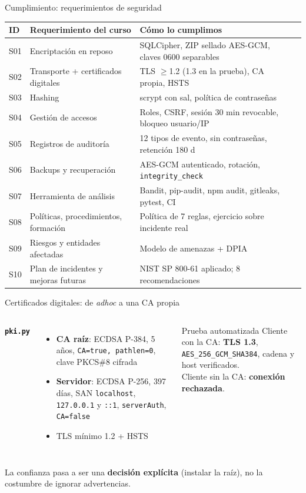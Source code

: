 \documentclass[aspectratio=169,11pt]{beamer}
\newcommand{\ok}{\textcolor{teal}{\textbf{\checkmark}}}
\begin{document}
\begin{frame}{Cumplimiento: requerimientos de seguridad}
\scriptsize
\begin{tabularx}{\textwidth}{@{}l Y Y c@{}}
\toprule
ID & Requerimiento del curso & Cómo lo cumplimos & \\
\midrule
S01 & Encriptación en reposo & SQLCipher, ZIP sellado AES-GCM, claves 0600 separables & \ok\\
S02 & Transporte + certificados digitales & TLS $\geq$1.2 (1.3 en la prueba), CA propia, HSTS & \ok\\
S03 & Hashing & scrypt con sal, política de contraseñas & \ok\\
S04 & Gestión de accesos & Roles, CSRF, sesión 30 min revocable, bloqueo usuario/IP & \ok\\
S05 & Registros de auditoría & 12 tipos de evento, sin contraseñas, retención 180 d & \ok\\
S06 & Backups y recuperación & AES-GCM autenticado, rotación, \texttt{integrity\_check} & \ok\\
S07 & Herramienta de análisis & Bandit, pip-audit, npm audit, gitleaks, pytest, CI & \ok\\
S08 & Políticas, procedimientos, formación & Política de 7 reglas, ejercicio sobre incidente real & \ok\\
S09 & Riesgos y entidades afectadas & Modelo de amenazas + DPIA & \ok\\
S10 & Plan de incidentes y mejoras futuras & NIST SP 800-61 aplicado; 8 recomendaciones & \ok\\
\bottomrule
\end{tabularx}
\end{frame}

\begin{frame}{Certificados digitales: de \emph{adhoc} a una CA propia}
\small
\begin{columns}[T,onlytextwidth]
\textbf{\texttt{pki.py}}
\begin{itemize}\setlength\itemsep{2pt}
\item \textbf{CA raíz}: ECDSA P-384, 5 años, \texttt{CA=true, pathlen=0}, clave PKCS\#8 cifrada
\item \textbf{Servidor}: ECDSA P-256, 397 días, SAN \texttt{localhost}, \texttt{127.0.0.1} y \texttt{::1}, \texttt{serverAuth}, \texttt{CA=false}
\item TLS mínimo 1.2 + HSTS
\end{itemize}
\begin{block}{Prueba automatizada}
\scriptsize Cliente con la CA: \textbf{TLS 1.3}, \texttt{AES\_256\_GCM\_SHA384}, cadena y host verificados.\\[3pt]
Cliente sin la CA: \textbf{conexión rechazada}.
\end{block}
\end{columns}
\medskip
\small La confianza pasa a ser una \textbf{decisión explícita} (instalar la raíz), no la costumbre de ignorar advertencias.
\end{frame}
\end{document}
